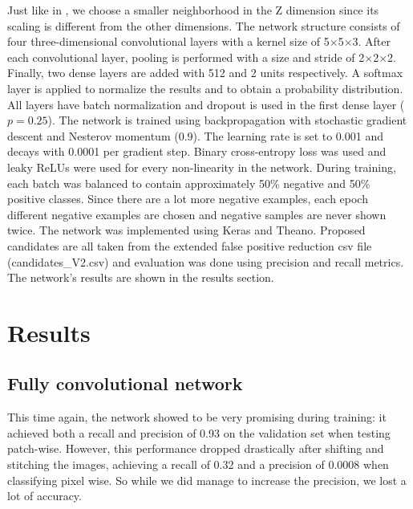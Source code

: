 \documentclass{article}
\begin{document}
	Just like in \cite{qidou}, we choose a smaller neighborhood in the Z dimension since its scaling is different from the other dimensions.
	The network structure consists of four three-dimensional convolutional layers with a kernel size of 5$\times$5$\times$3.
	After each convolutional layer, pooling is performed with a size and stride of 2$\times$2$\times$2.
	Finally, two dense layers are added with 512 and 2 units respectively.
	A softmax layer is applied to normalize the results and to obtain a probability distribution.
	All layers have batch normalization and dropout is used in the first dense layer ($p=0.25$).
	The network is trained using backpropagation with stochastic gradient descent and Nesterov momentum (0.9).
	The learning rate is set to 0.001 and decays with 0.0001 per gradient step.
	Binary cross-entropy loss was used and leaky ReLUs were used for every non-linearity in the network.
	During training, each batch was balanced to contain approximately 50\% negative and 50\% positive classes.
	Since there are a lot more negative examples, each epoch different negative examples are chosen and negative samples are never shown twice.
	The network was implemented using Keras and Theano.
	Proposed candidates are all taken from the extended false positive reduction csv file (candidates\_V2.csv) and evaluation was done using precision and recall metrics.
	The network's results are shown in the results section.
	
	
	\section{Results}\label{sec:results}
	\subsection{Fully convolutional network}
	\label{sec:fcn_results}
	This time again, the network showed to be very promising during training: it achieved both a recall and precision of 0.93 on the validation set when testing patch-wise. However, this performance dropped drastically after shifting and stitching the images, achieving a recall of 0.32 and a precision of 0.0008 when classifying pixel wise. So while we did manage to increase the precision, we lost a lot of accuracy.
	
\end{document}
